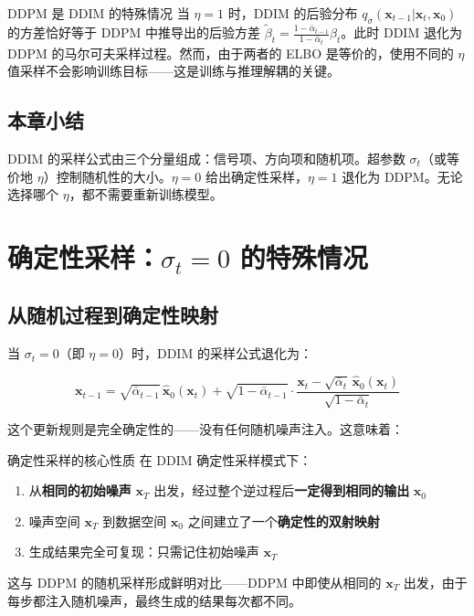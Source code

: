 \documentclass[a4paper]{article}
\begin{document}
\begin{warningbox}{DDPM 是 DDIM 的特殊情况}
当 $\eta = 1$ 时，DDIM 的后验分布 $q_\sigma(\mathbf{x}_{t-1}|\mathbf{x}_t, \mathbf{x}_0)$ 的方差恰好等于 DDPM 中推导出的后验方差 $\tilde{\beta}_t = \frac{1-\bar{\alpha}_{t-1}}{1-\bar{\alpha}_t}\beta_t$。此时 DDIM 退化为 DDPM 的马尔可夫采样过程。然而，由于两者的 ELBO 是等价的，使用不同的 $\eta$ 值采样不会影响训练目标——这是训练与推理解耦的关键。
\end{warningbox}

\subsection{本章小结}

DDIM 的采样公式由三个分量组成：信号项、方向项和随机项。超参数 $\sigma_t$（或等价地 $\eta$）控制随机性的大小。$\eta=0$ 给出确定性采样，$\eta=1$ 退化为 DDPM。无论选择哪个 $\eta$，都不需要重新训练模型。


\section{确定性采样：$\sigma_t = 0$ 的特殊情况}

\subsection{从随机过程到确定性映射}

当 $\sigma_t = 0$（即 $\eta = 0$）时，DDIM 的采样公式退化为：

$$
\mathbf{x}_{t-1} = \sqrt{\bar{\alpha}_{t-1}}\,\hat{\mathbf{x}}_0(\mathbf{x}_t) + \sqrt{1-\bar{\alpha}_{t-1}}\cdot\frac{\mathbf{x}_t - \sqrt{\bar{\alpha}_t}\,\hat{\mathbf{x}}_0(\mathbf{x}_t)}{\sqrt{1-\bar{\alpha}_t}}
$$

这个更新规则是完全确定性的——没有任何随机噪声注入。这意味着：

\begin{importantbox}{确定性采样的核心性质}
在 DDIM 确定性采样模式下：
\begin{enumerate}
    \item 从\textbf{相同的初始噪声} $\mathbf{x}_T$ 出发，经过整个逆过程后\textbf{一定得到相同的输出} $\mathbf{x}_0$
    \item 噪声空间 $\mathbf{x}_T$ 到数据空间 $\mathbf{x}_0$ 之间建立了一个\textbf{确定性的双射映射}
    \item 生成结果完全可复现：只需记住初始噪声 $\mathbf{x}_T$
\end{enumerate}
这与 DDPM 的随机采样形成鲜明对比——DDPM 中即使从相同的 $\mathbf{x}_T$ 出发，由于每步都注入随机噪声，最终生成的结果每次都不同。
\end{importantbox}
\end{document}
